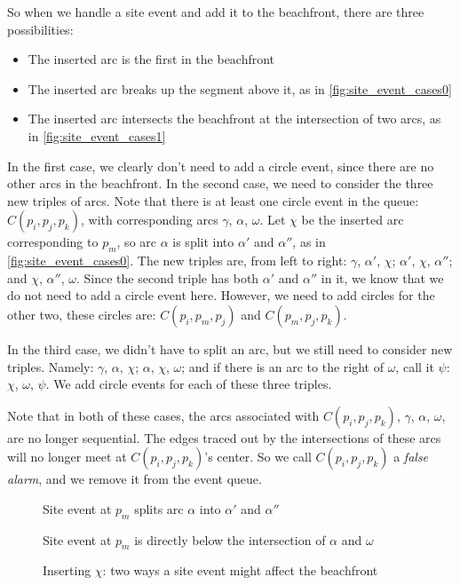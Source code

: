 \documentclass[12pt,twoside]{reedthesis}
\begin{document}
      So when we handle a site event and add it to the beachfront, there are three possibilities:
      \begin{itemize}
      \item The inserted arc is the first in the beachfront
      \item The inserted arc breaks up the segment above it, as in \cref{fig:site_event_cases0}
      \item The inserted arc intersects the beachfront at the intersection of two arcs, as in \cref{fig:site_event_cases1}
      \end{itemize}
      In the first case, we clearly don't need to add a circle event, since there are no other arcs in the beachfront. In the second case, we need to consider the three new triples of arcs. Note that there is at least one circle event in the queue: $C(p_{i}, p_{j}, p_{k})$, with corresponding arcs $\gamma$, $\alpha$, $\omega$. Let $\chi$ be the inserted arc corresponding to $p_{m}$, so arc $\alpha$ is split into $\alpha'$ and $\alpha''$, as in \cref{fig:site_event_cases0}. The new triples are, from left to right: $\gamma$, $\alpha'$, $\chi$; $\alpha'$, $\chi$, $\alpha''$; and $\chi$, $\alpha''$, $\omega$. Since the second triple has both $\alpha'$ and $\alpha''$ in it, we know that we do not need to add a circle event here. However, we need to add circles for the other two, these circles are: $C(p_{i}, p_{m}, p_{j})$ and $C(p_{m}, p_{j}, p_{k})$. \par

      In the third case, we didn't have to split an arc, but we still need to consider new triples. Namely: $\gamma$, $\alpha$, $\chi$; $\alpha$, $\chi$, $\omega$; and if there is an arc to the right of $\omega$, call it $\psi$:  $\chi$, $\omega$, $\psi$. We add circle events for each of these three triples.\par

      Note that in both of these cases, the arcs associated with $C(p_{i}, p_{j}, p_{k})$, $\gamma$, $\alpha$, $\omega$, are no longer sequential. The edges traced out by the intersections of these arcs will no longer meet at $C(p_{i}, p_{j}, p_{k})$'s center. So we call $C(p_{i}, p_{j}, p_{k})$ a \emph{false alarm}, and we remove it from the event queue.

      \begin{figure}[!htb]
        \centering
        \begin{subtable}{0.475\textwidth}
          \centering
          
          \caption{Site event at $p_{m}$ splits arc $\alpha$ into $\alpha'$ and $\alpha''$}
          \label{fig:site_event_cases0}
        \end{subtable}
        \begin{subtable}{0.475\textwidth}
          \centering
          
          \caption{Site event at $p_{m}$ is directly below the intersection of $\alpha$ and $\omega$}
          \label{fig:site_event_cases1}
        \end{subtable}
        \caption{Inserting $\chi$: two ways a site event might affect the beachfront}
        \label{fig:site_event_cases}
      \end{figure}
\end{document}
